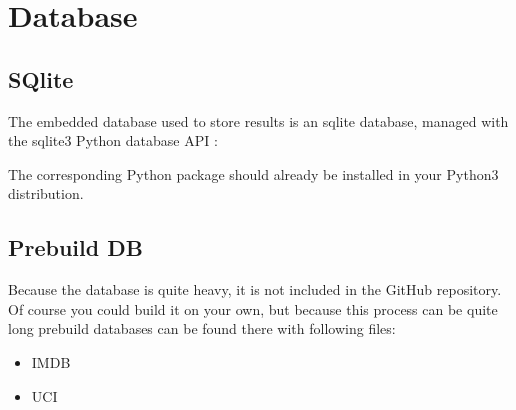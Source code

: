 \documentclass[letterpaper,10pt,english]{sphinxmanual}
\begin{document}
\section{Database}
\label{\detokenize{requirements:database}}

\subsection{SQlite}
\label{\detokenize{requirements:sqlite}}
\begin{DUlineblock}{0em}
\item[] The embedded database used to store results is an sqlite database, managed with the sqlite3 Python database API : 
\item[] The corresponding Python package should already be installed in your Python3 distribution.
\end{DUlineblock}


\subsection{Prebuild DB}
\label{\detokenize{requirements:prebuild-db}}
\begin{DUlineblock}{0em}
\item[] 
\item[] Because the database is quite heavy, it is not included in the GitHub repository. Of course you could build it on your own, but because this process can be quite long prebuild databases can be found there  with following files:
\end{DUlineblock}
\begin{itemize}
\item {} 
IMDB

\item {} 
UCI

\end{itemize}
\end{document}

